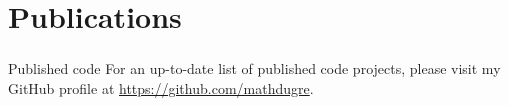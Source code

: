 \documentclass[]{friggeri-cv} %
\begin{document}



\section{Publications}







\subsubsection{}{Published code}
For an up-to-date list of published code projects, please visit my GitHub profile at
\href{https://github.com/mathdugre}{https://github.com/mathdugre}.

\end{document}
